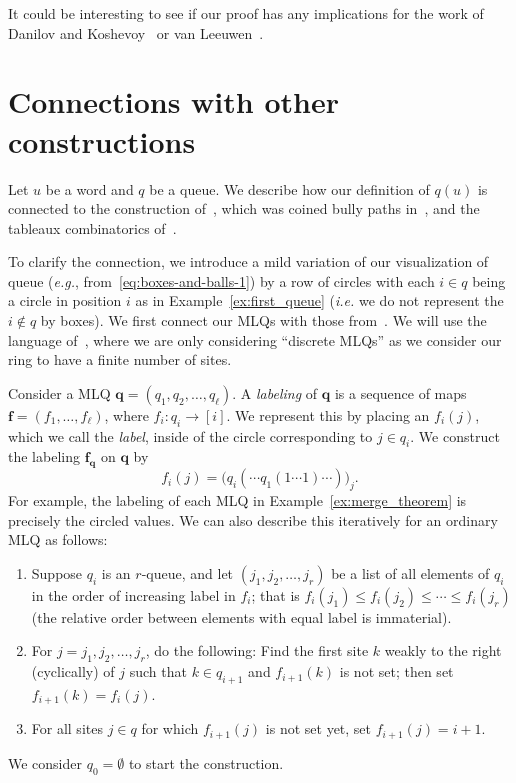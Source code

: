 \documentclass[reqno]{amsart}
\newcommand{\0}{\phantom{c}}
\newcommand{\ff}{\mathbf{f}}
\newcommand{\qq}{\mathbf{q}}
\newcommand{\tup}[1]{\left( #1 \right)}
\newcommand{\ive}[1]{\left[ #1 \right]}
\newcommand{\defn}[1]{{\color{darkred}\emph{#1}}} %
\theoremstyle{plain}
\theoremstyle{definition}
\numberwithin{equation}{section}
\begin{document}
It could be interesting to see if our proof has any implications for the work of Danilov and Koshevoy~\cite{DanilovKoshevoy} or van Leeuwen~\cite{vanLeeuwen-dc}.






\appendix

\section{Connections with other constructions}
\label{app:queue-relations}

Let $u$ be a word and $q$ be a queue.
We describe how our definition of $q(u)$ is connected to the construction of~\cite{FM07}, which was coined bully paths in~\cite{AasLin17}, and the tableaux combinatorics of~\cite{AssSea18}.

To clarify the connection, we introduce a mild variation of our visualization of queue (\textit{e.g.}, from~\eqref{eq:boxes-and-balls-1}) by a row of circles with each $i \in q$ being a circle in position $i$ as in Example~\ref{ex:first_queue} (\textit{i.e.} we do not represent the $i \notin q$ by boxes).
We first connect our MLQs with those from~\cite{FM07}.
We will use the language of~\cite{AasLin17}, where we are only considering ``discrete MLQs'' as we consider our ring to have a finite number of sites.

Consider a MLQ $\qq = (q_1, q_2, \dotsc, q_{\ell})$.
A \defn{labeling} of $\qq$ is a sequence of maps $\ff = (f_1, \dotsc, f_{\ell})$, where $f_i \colon q_i \to \ive{i}$.
We represent this by placing an $f_i(j)$, which we call the \defn{label}, inside of the circle corresponding to $j \in q_i$.
We construct the labeling $\ff_{\qq}$ on $\qq$ by
\[
f_i(j) = \bigl( q_i( \cdots q_1(1 \cdots 1) \cdots ) \bigr)_j.
\]
For example, the labeling of each MLQ in Example~\ref{ex:merge_theorem} is precisely the circled values.
We can also describe this iteratively for an ordinary MLQ as follows:
\begin{enumerate}
\item Suppose $q_i$ is an $r$-queue, and let $\tup{j_1, j_2, \ldots, j_r}$ be a list of all elements of $q_i$ in the order of increasing label in $f_i$; that is $f_i(j_1) \leq f_i(j_2) \leq \cdots \leq f_i(j_r)$ (the relative order between elements with equal label is immaterial).
\item For $j = j_1, j_2, \ldots, j_r$, do the following:
    Find the first site $k$ weakly to the right (cyclically) of $j$ such that $k \in q_{i+1}$ and $f_{i+1}(k)$ is not set; then set $f_{i+1}(k) = f_i(j)$.
\item For all sites $j \in q$ for which $f_{i+1}(j)$ is not set yet, set $f_{i+1}(j) = i+1$.
\end{enumerate}
We consider $q_0 = \emptyset$ to start the construction.
\end{document}
